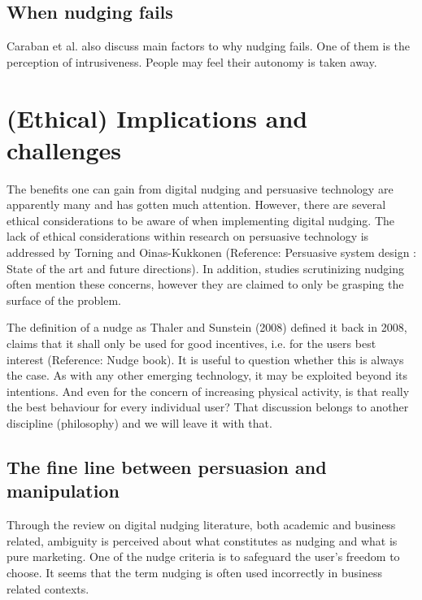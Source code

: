 \subsection{When nudging fails}
Caraban et al. also discuss main factors to why nudging fails. One of them is the perception of intrusiveness. People may feel their autonomy is taken away.

\section{(Ethical) Implications and challenges}
The benefits one can gain from digital nudging and persuasive technology are apparently many and has gotten much attention. However, there are several ethical considerations to be aware of when implementing digital nudging. The lack of ethical considerations within research on persuasive technology is addressed by Torning and Oinas-Kukkonen (Reference: Persuasive system design : State of the art and future directions). In addition, studies scrutinizing nudging often mention these concerns, however they are claimed to only be grasping the surface of the problem. 

The definition of a nudge as Thaler and Sunstein (2008) defined it back in 2008, claims that it shall only be used for good incentives, i.e. for the users best interest (Reference: Nudge book). It is useful to question whether this is always the case. As with any other emerging technology, it may be exploited beyond its intentions. And even for the concern of increasing physical activity, is that really the best behaviour for every individual user? That discussion belongs to another discipline (philosophy) and we will leave it with that. 

\subsection{The fine line between persuasion and manipulation}
Through the review on digital nudging literature, both academic and business related, ambiguity is perceived about what constitutes as nudging and what is pure marketing. One of the nudge criteria is to safeguard the user's freedom to choose. It seems that the term nudging is often used incorrectly in business related contexts. 

